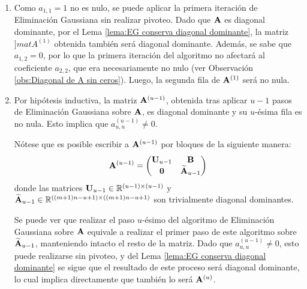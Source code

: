         \begin{enumerate}[label=(\roman*)]
            \item {} Como $a_{1,1} = 1$ no es nulo, se puede aplicar la primera iteración de Eliminación Gaussiana sin realizar pivoteo. Dado que $\mathbf{A}$ es diagonal dominante, por el Lema \ref{lema:EG conserva diagonal dominante}, la matriz $]mat{A}^{(1)}$ obtenida también será diagonal dominante. Además, se sabe que $a_{1,2} = 0$, por lo que la primera iteración del algoritmo no afectará al coeficiente $a_{2,2}$, que era necesariamente no nulo (ver Observación \ref{obs:Diagonal de A sin ceros}). Luego, la segunda fila de $\mathbf{A}^{(1)}$ será no nula.
                    
            \item {} Por hipótesis inductiva, la matriz $\mathbf{A}^{(u-1)}$, obtenida tras aplicar $u-1$ pasos de Eliminación Gaussiana sobre $\mathbf{A}$, es diagonal dominante y su $u$-ésima fila es no nula. Esto implica que $a^{(u-1)}_{u,u} \neq 0$.

            Nótese que es posible escribir a $\mathbf{A}^{(u-1)}$ por bloques de la siguiente manera:
            \[ \mathbf{A}^{(u-1)} = \left( \begin{matrix} \mathbf{U}_{u-1} & \mathbf{B} \\ \mathbf{0} & \widetilde{\mathbf{A}}_{u-1} \end{matrix} \right) \]
            donde las matrices $\mathbf{U}_{u-1} \in \mathbb{R}^{(u-1)\times(u-1)}$ y $\widetilde{\mathbf{A}}_{u-1} \in \mathbb{R}^{((m+1)n-u+1)\times((m+1)n-u+1)}$ son trivialmente diagonal dominantes.

            Se puede ver que realizar el paso $u$-ésimo del algoritmo de Eliminación Gaussiana sobre $\mathbf{A}$ equivale a realizar el primer paso de este algoritmo sobre $\widetilde{\mathbf{A}}_{u-1}$, manteniendo intacto el resto de la matriz. Dado que $a^{(u-1)}_{u,u} \neq 0$, esto puede realizarse sin pivoteo, y del Lema \ref{lema:EG conserva diagonal dominante} se sigue que el resultado de este proceso será diagonal dominante, lo cual implica directamente que también lo será $\mathbf{A}^{(u)}$.


\end{enumerate}
